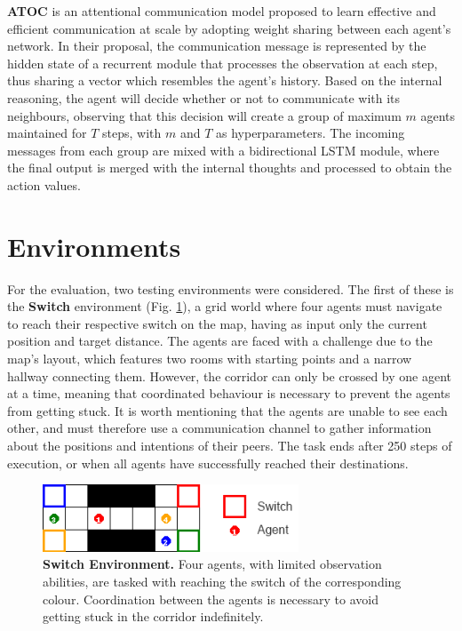 \documentclass[a4paper,singleside,12pt]{report} %
\begin{document}
\textbf{ATOC}\cite{ATOCJiang2018LearningAC} is an attentional communication model proposed to learn effective and efficient communication at scale by adopting weight sharing between each agent's network. In their proposal, the communication message is represented by the hidden state of a recurrent module that processes the observation at each step, thus sharing a vector which resembles the agent's history. Based on the internal reasoning, the agent will decide whether or not to communicate with its neighbours, observing that this decision will create a group of maximum $m$ agents maintained for $T$ steps, with $m$ and $T$ as hyperparameters. The incoming messages from each group are mixed with a bidirectional LSTM module, where the final output is merged with the internal thoughts and processed to obtain the action values.
 
\section{Environments}\label{Environments}
For the evaluation, two testing environments were considered. The first of these is the \textbf{Switch} environment (Fig. \ref{fig:switch}), a grid world where four agents must navigate to reach their respective switch on the map, having as input only the current position and target distance. The agents are faced with a challenge due to the map's layout, which features two rooms with starting points and a narrow hallway connecting them. However, the corridor can only be crossed by one agent at a time, meaning that coordinated behaviour is necessary to prevent the agents from getting stuck. It is worth mentioning that the agents are unable to see each other, and must therefore use a communication channel to gather information about the positions and intentions of their peers. The task ends after 250 steps of execution, or when all agents have successfully reached their destinations. 

\begin{figure}
  \centering
  \includegraphics[height=2cm]{images/switch.png}
  \caption{\textbf{Switch Environment.} Four agents, with limited observation abilities, are tasked with reaching the switch of the corresponding colour. Coordination between the agents is necessary to avoid getting stuck in the corridor indefinitely.}
  \label{fig:switch}
\end{figure}
\end{document}
